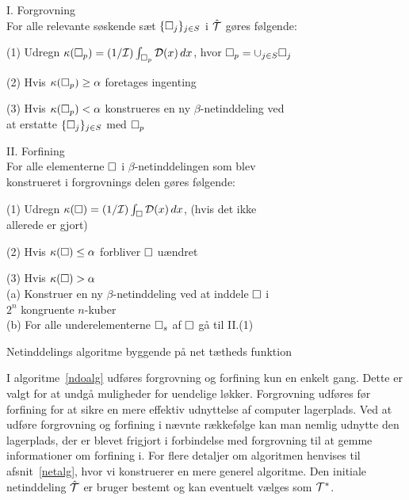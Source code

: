 \begin{Algoritme}[H] 
\begin{emptylist}
\setlength{\itemsep}{0cm}
\setlength{\parsep}{0cm}
  \item I. Forgrovning \\ 
        \makebox[.25in][r]{} For alle relevante søskende sæt
        $\{\Box_j\}_{j\in S}$ i $\hat{\mathcal T}$ gøres følgende:
  \item \makebox[.5in][r]{} (1) Udregn $\kappa(\Box_p)=(1/\mathcal I)\int_{\Box_p}
        {\mathcal{D}} (x)\, dx$, hvor $\Box_p=\cup_{j\in S}\Box_j$
  \item \makebox[.5in][r]{} (2) Hvis $\kappa(\Box_p)\geq\alpha$
        foretages ingenting 
  \item \makebox[.5in][r]{} (3) Hvis $\kappa(\Box_p)<\alpha$
         konstrueres en ny $\beta$-netinddeling ved \\
        \makebox[.5in][r]{} \makebox[\len][r]{} 
        at erstatte $\{\Box_j\}_{j\in S}$ med $\Box_p$ 
  \item II. Forfining \\
        \makebox[.25in][r]{} For alle elementerne $\Box$ i
        $\beta$-netinddelingen som blev \\
        \makebox[.25in][r]{} konstrueret i forgrovnings delen gøres følgende:    
  \item \makebox[.5in][r]{} (1) Udregn $\kappa(\Box)=(1/\mathcal I)\int_{\Box}
        {\mathcal{D}} (x)\, dx$, (hvis det ikke \\
        \makebox[.5in][r]{} \makebox[\len][r]{} allerede er gjort)
  \item \makebox[.5in][r]{} (2) Hvis $\kappa(\Box)\leq\alpha$
        forbliver $\Box$ uændret 
  \item \makebox[.5in][r]{} (3) Hvis $\kappa(\Box)>\alpha$ \\
        \makebox[.5in][r]{} \makebox[\len][r]{} (a) Konstruer en ny
        $\beta$-netinddeling ved at inddele $\Box$ i \\
        \makebox[.5in][r]{} \makebox[\len][r]{} \makebox[\len][r]{} 
        $2^n$ kongruente $n$-kuber \\
        \makebox[.5in][r]{} \makebox[\len][r]{} (b) For alle
        underelementerne $\Box_s$ af $\Box$ gå til II.(1)
\end{emptylist}
\caption{Netinddelings algoritme byggende på net tætheds funktion\label{ndoalg}}
\end{Algoritme}

\begin{remark}
I algoritme~\ref{ndoalg} udføres forgrovning og forfining kun en 
enkelt gang. Dette er valgt for at undgå muligheder for 
uendelige løkker. Forgrovning udføres før forfining for at sikre
en mere effektiv udnyttelse af computer lagerplads. Ved at udføre
forgrovning og forfining i nævnte rækkefølge kan man nemlig 
udnytte den lagerplads, der er blevet frigjort i forbindelse med
forgrovning til at gemme informationer om forfining i. For flere 
detaljer om algoritmen henvises til afsnit~\ref{netalg}, hvor vi 
konstruerer en mere generel algoritme. Den initiale netinddeling
$\hat{\mathcal T}$ er bruger bestemt og kan eventuelt vælges som $\mathcal T^{\ast}$.
\end{remark}

